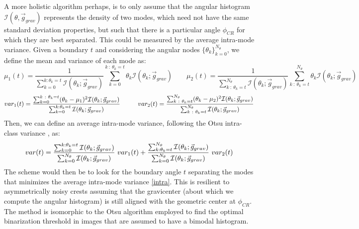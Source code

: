 \documentclass[11pt, a4paper, twoside]{article} %
\begin{document}
A more holistic algorithm perhaps, is to only assume that the angular histogram $\mathcal{I}(\theta,\vec{g}_{grav})$ represents the density of two modes, which need not have the same standard deviation properties, but such that there is a particular angle $\phi_{CR}$ for which they are best separated. This could be measured by the average intra-mode variance. Given a boundary $t$ and considering the angular nodes $\{\theta_k\}_{k=0}^{N_\theta}$, we define the mean and variance of each mode as:\vspace{-0.15cm}
\begin{equation}
\mu_1(t) = \frac{1}{\sum_{k=0}^{k:\theta_k=t}\mathcal{I}(\theta_k; \vec{g}_{grav})}\sum_{k=0}^{k\ :\ \theta_k=t} \theta_k\mathcal{I}(\theta_k; \vec{g}_{grav})\quad  \quad \mu_2(t) = \frac{1}{\sum_{k\ :\ \theta_k=t}^{N_{\theta}}\mathcal{I}(\theta_k; \vec{g}_{grav})}\sum_{k\ :\ \theta_k=t}^{N_{\theta}} \theta_k\mathcal{I}(\theta_k; \vec{g}_{grav})
\end{equation}
\begin{equation}
\small
var_1(t)= \frac{\sum_{k=0}^{k\ :\ \theta_k=t} (\theta_k-\mu_1)^2\mathcal{I}(\theta_k; \vec{g}_{grav})}{\sum_{k=0}^{k:\theta_k=t}\mathcal{I}(\theta_k; \vec{g}_{grav})}\quad  \quad \quad var_2(t) = \frac{\sum_{k\ :\ \theta_k=t}^{N_{\theta}} (\theta_k-\mu_2)^2\mathcal{I}(\theta_k; \vec{g}_{grav})}{\sum_{k\ :\ \theta_k=t}^{N_{\theta}}\mathcal{I}(\theta_k; \vec{g}_{grav})}
\end{equation}
Then, we can define an average intra-mode variance, following the Otsu intra-class variance \cite{Otsu}, as:
\begin{equation}\label{intra}
\small
var(t) = \frac{\sum_{k=0}^{k:\theta_k=t}\mathcal{I}(\theta_k; \vec{g}_{grav})}{\sum_{k=0}^{N_{\theta}}\mathcal{I}(\theta_k; \vec{g}_{grav})}\ var_1(t)+\frac{\sum_{k:\theta_k=t}^{N_{\theta}}\mathcal{I}(\theta_k; \vec{g}_{grav})}{\sum_{k=0}^{N_{\theta}}\mathcal{I}(\theta_k; \vec{g}_{grav})}\ var_2(t)
\end{equation}
The scheme would then be to look for the boundary angle $t$ separating the modes that minimizes the average intra-mode variance \eqref{intra}. This is resilient to asymmetrically noisy crests assuming that the gravicenter (about which we compute the angular histogram) is still aligned with the geometric center at $\phi_{CR}$. The method is isomorphic to the Otsu algorithm \cite{Otsu} employed to find the optimal binarization threshold in images that are assumed to have a bimodal histogram.
\end{document}

